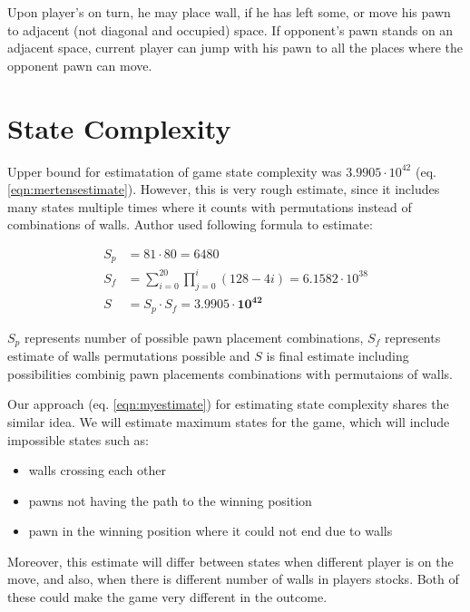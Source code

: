 Upon player's on turn, he may place wall, if he has left some, or move
his pawn to adjacent (not diagonal and occupied) space.
If opponent's pawn stands on an adjacent space, current player can jump
with his pawn to all the places where the opponent pawn can move.

\section{State Complexity}
Upper bound for estimatation of game state complexity was $3.9905\cdot10^{42}$
\cite{mertens} (eq. \ref{eqn:mertensestimate}). However, this is very
rough estimate, since it includes many states multiple times where it counts
with permutations instead of combinations of walls. Author used following
formula to estimate:

\begin{center}
  \vspace*{-1.30cm}
  \begin{equation}
    \label{eqn:mertensestimate}
    \begin{aligned}
      S_p\!&=\!81 \cdot 80 = 6480 \\
      S_f\!&=\!\sum_{i=0}^{20}\prod_{j=0}^{i}(128 - 4i)\!=\!6.1582{\cdot}10^{38} \\
      S\!&=\!S_p \cdot S_f = \mathbf{3.9905 \cdot 10 ^{42}}
    \end{aligned}
  \end{equation}
  \vspace*{-1.15cm}
\end{center}

$S_p$ represents number of possible pawn placement combinations, $S_f$
represents estimate of walls permutations possible and $S$ is final
estimate including possibilities combinig pawn placements combinations with
permutaions of walls.

Our approach (eq. \ref{eqn:myestimate}) for estimating state complexity
shares the similar idea. We will estimate maximum states for the game,
which will
include impossible states such as:
\begin{itemize}
  \vspace*{-0.25cm}
  \setlength\itemsep{0cm}
  \item walls crossing each other
  \item pawns not having the path to the winning position
  \item pawn in the winning position where it could not end due to walls
  \vspace*{-0.15cm}
\end{itemize}
Moreover, this estimate will differ between states when different
player is on the move, and also, when there is different number of walls
in players stocks. Both of these could make the game very different
in the outcome.

